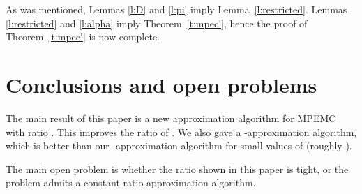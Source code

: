 \documentclass{llncs}
\begin{document}
As was mentioned, Lemmas \ref{l:D} and \ref{l:pi} imply Lemma~\ref{l:restricted}.
Lemmas \ref{l:restricted} and \ref{l:alpha} imply Theorem~\ref{t:mpec'},
hence the proof of Theorem~\ref{t:mpec'} is now complete.

\section{Conclusions and open problems}

The main result of this paper is a new approximation algorithm for {\sf MPEMC}
with ratio . This improves the ratio  of \cite{KMNT}.
We also gave a -approximation algorithm, which is better than our 
-approximation algorithm for small values of  (roughly ).

The main open problem is whether the ratio  shown in this paper
is tight, or the problem admits a constant ratio approximation algorithm. 



\end{document}
